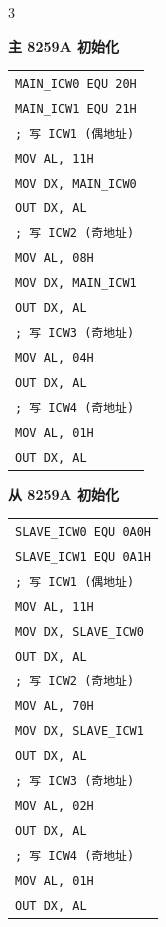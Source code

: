 \documentclass[10pt, a4paper, landscape]{article}
\newcommand{\blue}[1]{\textbf{\textcolor{myblue}{#1}}}
\begin{document}
\begin{multicols*}{3}
{    \noindent
    \begin{minipage}[t]{0.49\linewidth}\vspace{0pt}
        \blue{\textbf{主 8259A 初始化}}
        \vspace{5pt}
        \begin{tabular}{@{}l@{}}
        \texttt{MAIN\_ICW0 EQU 20H} \\
        \texttt{MAIN\_ICW1 EQU 21H} \\[8pt]
        \texttt{; 写 ICW1 (偶地址)} \\
        \texttt{MOV AL, 11H} \\
        \texttt{MOV DX, MAIN\_ICW0} \\
        \texttt{OUT DX, AL} \\[8pt]
        \texttt{; 写 ICW2 (奇地址)} \\
        \texttt{MOV AL, 08H} \\
        \texttt{MOV DX, MAIN\_ICW1} \\
        \texttt{OUT DX, AL} \\[8pt]
        \texttt{; 写 ICW3 (奇地址)} \\
        \texttt{MOV AL, 04H} \\
        \texttt{OUT DX, AL} \\[8pt]
        \texttt{; 写 ICW4 (奇地址)} \\
        \texttt{MOV AL, 01H} \\
        \texttt{OUT DX, AL}
        \end{tabular}
    \end{minipage}\hfill
    \begin{minipage}[t]{0.49\linewidth}\vspace{0pt}
        \blue{\textbf{从 8259A 初始化}}
        \vspace{5pt}
        \begin{tabular}{@{}l@{}}
        \texttt{SLAVE\_ICW0 EQU 0A0H} \\
        \texttt{SLAVE\_ICW1 EQU 0A1H} \\[8pt]
        \texttt{; 写 ICW1 (偶地址)} \\
        \texttt{MOV AL, 11H} \\
        \texttt{MOV DX, SLAVE\_ICW0} \\
        \texttt{OUT DX, AL} \\[8pt]
        \texttt{; 写 ICW2 (奇地址)} \\
        \texttt{MOV AL, 70H} \\
        \texttt{MOV DX, SLAVE\_ICW1} \\
        \texttt{OUT DX, AL} \\[8pt]
        \texttt{; 写 ICW3 (奇地址)} \\
        \texttt{MOV AL, 02H} \\
        \texttt{OUT DX, AL} \\[8pt]
        \texttt{; 写 ICW4 (奇地址)} \\
        \texttt{MOV AL, 01H} \\
        \texttt{OUT DX, AL}
        \end{tabular}
    \end{minipage}
}


\end{multicols*}
\end{document}
